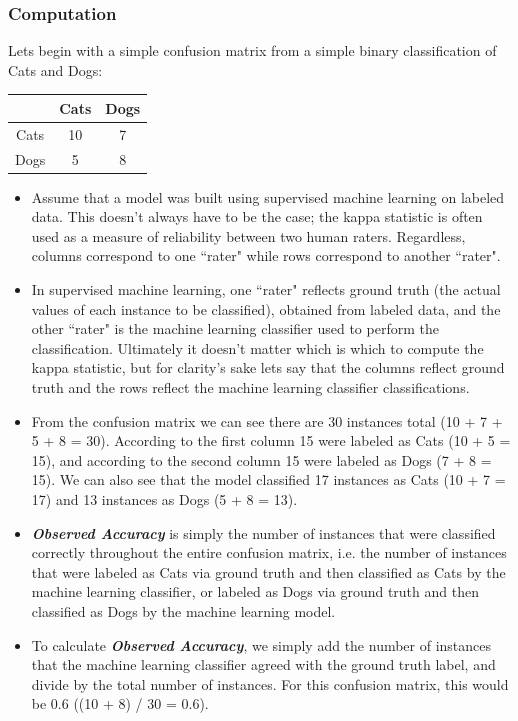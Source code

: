 \documentclass[caret-main.tex]{subfiles}
\begin{document}
\subsubsection{Computation}
Lets begin with a simple confusion matrix from a simple binary classification of Cats and Dogs:
\begin{center}
\begin{tabular}{|c|c|c|}
\hline 
    & Cats &Dogs \\ \hline
Cats& 10 & 7 \\ \hline
Dogs& 5  & 8  \\ \hline
\end{tabular} 
\end{center}
\begin{itemize}
\item Assume that a model was built using supervised machine learning on labeled data. This doesn't always have to be the case; the kappa statistic is often used as a measure of reliability between two human raters. Regardless, columns correspond to one ``rater" while rows correspond to another ``rater". 

\item In supervised machine learning, one ``rater" reflects ground truth (the actual values of each instance to be classified), obtained from labeled data, and the other ``rater" is the machine learning classifier used to perform the classification. Ultimately it doesn't matter which is which to compute the kappa statistic, but for clarity's sake lets say that the columns reflect ground truth and the rows reflect the machine learning classifier classifications.

\item From the confusion matrix we can see there are 30 instances total (10 + 7 + 5 + 8 = 30). According to the first column 15 were labeled as Cats (10 + 5 = 15), and according to the second column 15 were labeled as Dogs (7 + 8 = 15). We can also see that the model classified 17 instances as Cats (10 + 7 = 17) and 13 instances as Dogs (5 + 8 = 13).

\item \textbf{\textit{Observed Accuracy}} is simply the number of instances that were classified correctly throughout the entire confusion matrix, i.e. the number of instances that were labeled as Cats via ground truth and then classified as Cats by the machine learning classifier, or labeled as Dogs via ground truth and then classified as Dogs by the machine learning model. 
\item To calculate \textbf{\textit{Observed Accuracy}}, we simply add the number of instances that the machine learning classifier agreed with the ground truth label, and divide by the total number of instances. For this confusion matrix, this would be 0.6 ((10 + 8) / 30 = 0.6).


\end{itemize}
\end{document}
